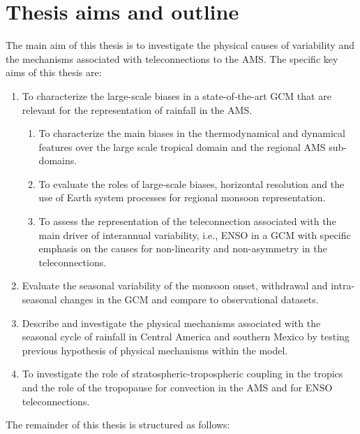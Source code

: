 \section{Thesis aims and outline}
The main aim of this thesis is to investigate the physical causes of variability and the mechanisms associated with teleconnections to the AMS. The specific key aims of this thesis are: 

\begin{enumerate}
\item To characterize the large-scale biases in a state-of-the-art GCM that are relevant for the representation of rainfall in the AMS.  
\begin{enumerate}
\item To characterize the main biases in the thermodynamical and dynamical features over the large scale tropical domain and the regional AMS sub-domains.
\item To evaluate the roles of large-scale biases, horizontal resolution and the use of Earth system processes for regional monsoon representation.
\item To assess the representation of the teleconnection associated with the main driver of interannual variability, i.e., ENSO in a GCM with specific emphasis on the causes for non-linearity and non-asymmetry in the teleconnections.
\end{enumerate}
\item Evaluate the seasonal variability of the monsoon onset, withdrawal and intra-seasonal changes in the GCM and compare to observational datasets. 
\item Describe and investigate the physical mechanisms associated with the seasonal cycle of rainfall in Central America and southern Mexico by testing previous hypothesis of physical mechanisms within the model.
\item To investigate the role of stratospheric-tropospheric coupling in the tropics and the role of the tropopause for convection in the AMS and for ENSO teleconnections.
\end{enumerate}

The remainder of this thesis is structured as follows:

